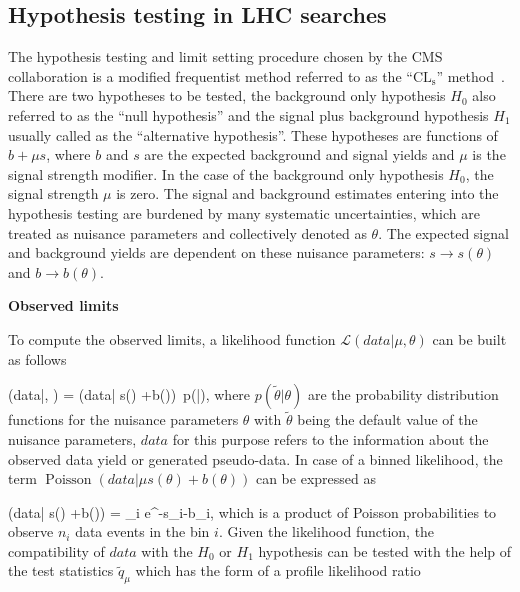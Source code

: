 \subsection{Hypothesis testing in LHC searches~\label{sec:stats} }

The hypothesis testing and limit setting procedure chosen by the CMS collaboration is a modified frequentist method referred to as the ``$\mathrm{CL_{s}}$'' method~\cite{Read:2002hq, CMS-NOTE-2011-005}. There are two hypotheses to be tested, the background only hypothesis $H_{0}$ also referred to as the ``null hypothesis'' and the signal plus background hypothesis $H_{1}$ usually called as the ``alternative hypothesis''. These hypotheses are functions of $b+\mu s$, where $b$ and $s$ are the expected background and signal yields and $\mu$ is the signal strength modifier. In the case of the background only hypothesis $H_{0}$, the signal strength $\mu$ is zero. The signal and background estimates entering into the hypothesis testing are burdened by many systematic uncertainties, which are  treated as nuisance parameters and collectively denoted as $\theta$. The expected signal and background yields are dependent on these nuisance parameters: $s \to s(\theta)$ and $b \to b(\theta)$.

\textbf{Observed limits}

To compute the observed limits, a likelihood function $\mathcal{L}(data|\mu, \theta)$ can be built as follows~\cite{CMS-NOTE-2011-005}

{
(data|\mu, \theta) = (data| \mu s(\theta) +b(\theta))~p(\tilde{\theta}|\theta),
}
where $p(\tilde{\theta}|\theta)$ are the probability distribution functions for the nuisance parameters $\theta$ with $\tilde{\theta}$ being the default value of the nuisance parameters, $data$ for this purpose refers to the information about the observed data yield or generated pseudo-data. In case of a binned likelihood, the term $\operatorname{Poisson}(data| \mu s(\theta) +b(\theta))$ can be expressed as


{
(data| \mu s(\theta) +b(\theta))  = \prod_{i}  e^{-\mu s_{i}-b_{i}},
}
which is a product  of Poisson probabilities to observe $n_{i}$ data events in the bin $i$. Given the likelihood function, the compatibility of $data$ with the $H_{0}$ or $H_{1}$ hypothesis can be tested with the help of the test statistics $\tilde{q}_{\mu}$ which has the form of a profile likelihood ratio

